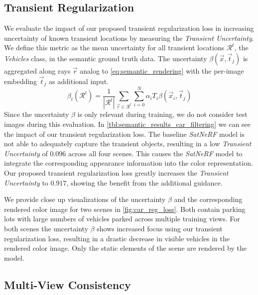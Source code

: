 \subsection{Transient Regularization}
\label{subsec:transient_reg}



We evaluate the impact of our proposed transient regularization loss in increasing uncertainty of known transient locations by measuring the \emph{Transient Uncertainty}.
We define this metric as the mean uncertainty for all transient locations $\mathcal{R}^t$, \ie the \emph{Vehicles} class, in the semantic ground truth data. The uncertainty $\beta(\vec{x}, \vec{t}_j)$ is aggregated along rays $\vec{r}$ analog to \cref{eq:semantic_rendering} with the per-image embedding $\vec{t}_j$ as additional input. 
\begin{equation}
	\beta_t(\mathcal{R}^t) = \frac{1}{|\mathcal{R}^t|}\sum_{\vec{r} \in \mathcal{R}^t} \sum_{i = 0}^{N} \alpha_i T_i \beta(\vec{x}_i, \vec{t}_j)
\end{equation}
Since the uncertainty $\beta$ is only relevant during training, we do not consider test images during this evaluation. 
In \cref{tbl:semantic_results_car_filtering} we can see the impact of our transient regularization loss. 
The baseline \emph{SatNeRF} \cite{satnerf} model is not able to adequately capture the transient objects, resulting in a low \emph{Transient Uncertainty} of $0.096$ across all four scenes. 
This causes the \emph{SatNeRF} model to integrate the corresponding appearance information into the color representation.
Our proposed transient regularization loss greatly increases the \emph{Transient Uncertainty} to $0.917$, showing the benefit from the additional guidance. 

We provide close up visualizations of the uncertainty $\beta$ and the corresponding rendered color image for two scenes in \cref{fig:car_reg_loss}. Both contain parking lots with large numbers of vehicles parked across multiple training views.
For both scenes the uncertainty $\beta$ shows increased focus using our transient regularization loss, resulting in a drastic decrease in visible vehicles in the rendered color image. 
Only the static elements of the scene are rendered by the model.



\subsection{Multi-View Consistency}
\label{subsec:multi_view_consistency}
 


